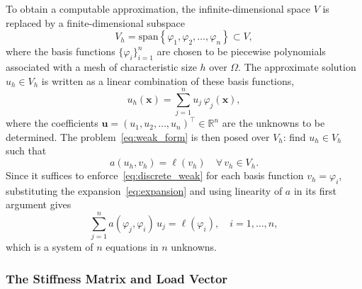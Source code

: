 \documentclass[12pt]{article}
\theoremstyle{definition}
\theoremstyle{remark}
\begin{document}
To obtain a computable approximation, the infinite-dimensional space $V$ is
replaced by a finite-dimensional subspace
\begin{equation}
    V_h = \mathrm{span}\left\{\varphi_1, \varphi_2, \ldots, \varphi_n\right\}
    \subset V,
\end{equation}
where the basis functions $\{\varphi_i\}_{i=1}^n$ are chosen to be piecewise
polynomials associated with a mesh of characteristic size $h$ over $\Omega$.
The approximate solution $u_h \in V_h$ is written as a linear combination of
these basis functions,
\begin{equation}
    u_h(\mathbf{x}) = \sum_{j=1}^{n} u_j\, \varphi_j(\mathbf{x}),
    \label{eq:expansion}
\end{equation}
where the coefficients $\mathbf{u} = (u_1, u_2, \ldots, u_n)^\top \in
\mathbb{R}^n$ are the unknowns to be determined. The problem~\eqref{eq:weak_form}
is then posed over $V_h$: find $u_h \in V_h$ such that
\begin{equation}
    a(u_h, v_h) = \ell(v_h) \quad \forall\, v_h \in V_h.
    \label{eq:discrete_weak}
\end{equation}
Since it suffices to enforce~\eqref{eq:discrete_weak} for each basis function
$v_h = \varphi_i$, substituting the expansion~\eqref{eq:expansion} and using
linearity of $a$ in its first argument gives
\begin{equation}
    \sum_{j=1}^{n} a(\varphi_j, \varphi_i)\, u_j = \ell(\varphi_i),
    \quad i = 1, \ldots, n,
\end{equation}
which is a system of $n$ equations in $n$ unknowns.

\subsubsection{The Stiffness Matrix and Load Vector}\label{sec:stiffness}
\end{document}
